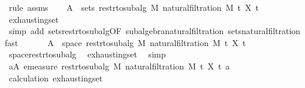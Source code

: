 \begin{isabellebody}
\ {\isacharparenleft}{\kern0pt}rule\ assms{\isacharparenright}{\kern0pt}\isanewline
\ \ \isamarkupfalse%
\ {\isachardoublequoteopen}A\ {\isasymsubseteq}\ sets\ {\isacharparenleft}{\kern0pt}restr{\isacharunderscore}{\kern0pt}to{\isacharunderscore}{\kern0pt}subalg\ M\ {\isacharparenleft}{\kern0pt}natural{\isacharunderscore}{\kern0pt}filtration\ M\ t\ X\ t\ \isamarkupfalse%
\ exhausting{\isacharunderscore}{\kern0pt}set\ \isamarkupfalse%
\ {\isacharparenleft}{\kern0pt}simp\ add{\isacharcolon}{\kern0pt}\ sets{\isacharunderscore}{\kern0pt}restr{\isacharunderscore}{\kern0pt}to{\isacharunderscore}{\kern0pt}subalg{\isacharbrackleft}{\kern0pt}OF\ subalgebra{\isacharunderscore}{\kern0pt}natural{\isacharunderscore}{\kern0pt}filtration{\isacharbrackright}{\kern0pt}\ sets{\isacharunderscore}{\kern0pt}natural{\isacharunderscore}{\kern0pt}filtration{\isacharparenright}{\kern0pt}\ fast\isanewline
\ \ \isamarkupfalse%
\ \isamarkupfalse%
\ {\isachardoublequoteopen}{\isasymUnion}\ A\ {\isacharequal}{\kern0pt}\ space\ {\isacharparenleft}{\kern0pt}restr{\isacharunderscore}{\kern0pt}to{\isacharunderscore}{\kern0pt}subalg\ M\ {\isacharparenleft}{\kern0pt}natural{\isacharunderscore}{\kern0pt}filtration\ M\ t\ X\ t\ \isamarkupfalse%
\ space{\isacharunderscore}{\kern0pt}restr{\isacharunderscore}{\kern0pt}to{\isacharunderscore}{\kern0pt}subalg\ \isamarkupfalse%
\ exhausting{\isacharunderscore}{\kern0pt}set\ \isamarkupfalse%
\ simp\isanewline
\ \ \isamarkupfalse%
\ \isamarkupfalse%
\ {\isachardoublequoteopen}{\isasymforall}a{\isasymin}A{\isachardot}{\kern0pt}\ emeasure\ {\isacharparenleft}{\kern0pt}restr{\isacharunderscore}{\kern0pt}to{\isacharunderscore}{\kern0pt}subalg\ M\ {\isacharparenleft}{\kern0pt}natural{\isacharunderscore}{\kern0pt}filtration\ M\ t\ X\ t\ a\ {\isasymnoteq}\ {\isasyminfinity}{\isachardoublequoteclose}\ \isamarkupfalse%
\ calculation{\isacharparenleft}{\kern0pt}{}{\isacharparenright}{\kern0pt}\ exhausting{\isacharunderscore}{\kern0pt}set{\isacharparenleft}{\kern0pt}{}{\isacharparenright}{\kern0pt}\ \isanewline

\end{isabellebody}
